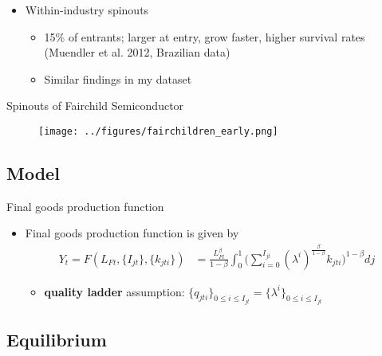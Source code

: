 \documentclass[english,usenames,dvipsnames]{beamer}
\begin{document}
\begin{frame}\label{spinouts_facts_from_literature}
\hyperlink{motivation_spillovers}{}
	\begin{itemize}
	\item Within-industry spinouts
		\begin{itemize}
		\item 15\% of entrants; larger at entry, grow faster, higher survival rates (Muendler et al. 2012, Brazilian data)
		\item Similar findings in my dataset
		\end{itemize}
	\end{itemize}
\end{frame}



\begin{frame}{Spinouts of Fairchild Semiconductor}\label{fairchildren_early}
\hyperlink{motivation_spillovers}{}
\begin{figure}
	\texttt{[image: ../figures/fairchildren\_early.png]}
\end{figure}
\end{frame}

\subsection{Model}

\begin{frame}{Final goods production function}\label{definition:final_goods_production}\hyperlink{main:final_goods_production}{}
	\begin{itemize}
		\item Final goods production function is given by
		\begin{align*}
		Y_t = F(L_{Ft},\{I_{jt}\},\{k_{jti}\}) &= \frac{L_{Ft}^{\beta}}{1-\beta} \int_0^1 \Big(\sum_{i = 0}^{I_{jt}} (\lambda^{i})^{\frac{\beta}{1-\beta}} k_{jti} \Big)^{1-\beta} dj 
		\end{align*}
		\begin{itemize}
			\item \alert{\textbf{quality ladder}} assumption: $\{q_{jti}\}_{0 \le i \le I_{jt}} = \{\lambda^i\}_{0 \le i \le I_{jt}}$
		\end{itemize}
	\end{itemize}
\end{frame}


\subsection{Equilibrium}
\end{document}
